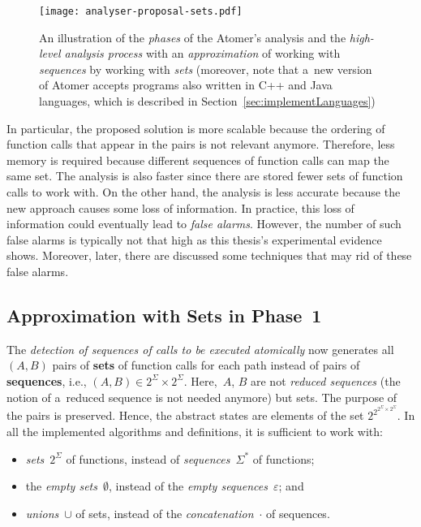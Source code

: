 \begin{figure}[hbt]
    \centering
    \texttt{[image: analyser-proposal-sets.pdf]}
    \caption{An illustration of the \emph{phases} of the Atomer's analysis and the \emph{high-level analysis process} with an \emph{approximation} of working with \emph{sequences} by working with \emph{sets} (moreover, note that a~new version of Atomer accepts programs also written in C++ and Java languages, which is described in Section~\ref{sec:implementLanguages})}
    \label{fig:atomerPhasesSets}
\end{figure}

In particular, the proposed solution is more scalable because the ordering of function calls that appear in the pairs is not relevant anymore. Therefore, less memory is required because different sequences of function calls can map the same set. The analysis is also faster since there are stored fewer sets of function calls to work with. On the other hand, the analysis is less accurate because the new approach causes some loss of information. In practice, this loss of information could eventually lead to \emph{false alarms}. However, the number of such false alarms is typically not that high as this thesis's experimental evidence shows. Moreover, later, there are discussed some techniques that may rid of these false alarms.

\subsection{Approximation with Sets in Phase~1}

The \emph{detection of sequences of calls to be executed atomically} now generates all $ (A, B) $ pairs of \textbf{sets} of function calls for each path instead of pairs of \textbf{sequences}, i.e., $ (A, B) \in 2^\Sigma \times 2^\Sigma $. Here,~$ A $, $ B $ are not \emph{reduced sequences} (the notion of a~reduced sequence is not needed anymore) but sets. The purpose of the pairs is preserved. Hence, the abstract states are elements of the set $ 2^{2^{2^\Sigma \times 2^\Sigma}} $. In all the implemented algorithms and definitions, it is sufficient to work with:
\begin{itemize}
    \item \emph{sets}~$ 2^\Sigma $ of functions, instead of \emph{sequences}~$ \Sigma^* $ of functions;

    \item the \emph{empty sets}~$ \emptyset $, instead of the \emph{empty sequences}~$ \varepsilon $; and

    \item \emph{unions}~$ \cup $ of sets, instead of the \emph{concatenation}~$ \cdot $ of sequences.
\end{itemize}

